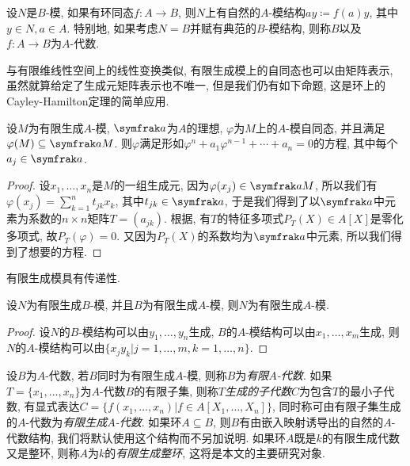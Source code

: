 设$N$是$B$-模, 如果有环同态$f\colon A\to B$, 则$N$上有自然的$A$-模结构$ay\coloneq f(a)y$, 其中$y\in N, a\in A$. 特别地, 如果考虑$N=B$并赋有典范的$B$-模结构, 则称$B$以及$f\colon A\to B$为$A$-代数.

与有限维线性空间上的线性变换类似, 有限生成模上的自同态也可以由矩阵表示, 虽然就算给定了生成元矩阵表示也不唯一, 但是我们仍有如下命题, 这是环上的Cayley-Hamilton定理的简单应用.

\begin{proposition}\label{prop:fgmoduleendomorphism}
  设$M$为有限生成$A$-模, $\ideal{a}$为$A$的理想, $\varphi$为$M$上的$A$-模自同态, 并且满足$\varphi(M)\subseteq \ideal{a}M$. 则$\varphi$满足形如$\varphi^n+a_1\varphi^{n-1}+\dotsb +a_n=0$的方程, 其中每个$a_j\in \ideal{a}$.
\end{proposition}

\begin{proof}
  设$x_1, \dotsc, x_n$是$M$的一组生成元, 因为$\varphi (x_j)\in \ideal{a}M$, 所以我们有$\varphi (x_j)=\sum_{k=1}^n t_{jk}x_k$, 其中$t_{jk}\in \ideal{a}$, 于是我们得到了以$\ideal{a}$中元素为系数的$n\times n$矩阵$T=(a_{jk})$. 根据, 有$T$的特征多项式$P_T(X)\in A[X]$是零化多项式, 故$P_T(\varphi)=0$. 又因为$P_T(X)$的系数均为$\ideal{a}$中元素, 所以我们得到了想要的方程.
\end{proof}

有限生成模具有传递性.

\begin{proposition}\label{prop:fgmodule}
  设$N$为有限生成$B$-模, 并且$B$为有限生成$A$-模, 则$N$为有限生成$A$-模.
\end{proposition}

\begin{proof}
  设$N$的$B$-模结构可以由$y_1, \dotsc, y_n$生成, $B$的$A$-模结构可以由$x_1, \dotsc, x_m$生成, 则$N$的$A$-模结构可以由$\{x_jy_k\vert j=1, \dotsc, m, k=1, \dotsc, n\}$.
\end{proof}

\begin{definition}
  设$B$为$A$-代数, 若$B$同时为有限生成$A$-模, 则称$B$为\emph{有限$A$-代数}. 如果$T=\{x_1, \dotsc, x_n\}$为$A$-代数$B$的有限子集, 则称$T$\emph{生成的子代数}$C$为包含$T$的最小子代数, 有显式表达$C=\{f(x_1, \dotsc, x_n)\vert f\in A[X_1, \dotsc, X_n]\}$, 同时称可由有限子集生成的$A$-代数为\emph{有限生成$A$-代数}. 如果环$A\subseteq B$, 则$B$有由嵌入映射诱导出的自然的$A$-代数结构, 我们将默认使用这个结构而不另加说明. 如果环$A$既是$k$的有限生成代数又是整环, 则称$A$为$k$的\emph{有限生成整环}, 这将是本文的主要研究对象.
\end{definition}

